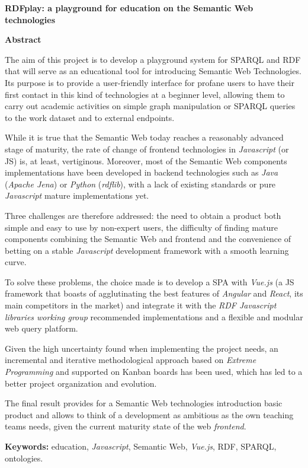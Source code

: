 %
\noindent \begin{center}
	\textbf{\Large{}RDFplay: a playground for education on the Semantic Web technologies}
	\par\end{center}{\Large \par}

\noindent \begin{center}
\textbf{\Large{}Abstract}
\par\end{center}{\Large \par}


The aim of this project is to develop a playground system for \gls{SPARQL} and \gls{RDF} that will serve as an educational tool for introducing Semantic Web Technologies. Its purpose is to provide a user-friendly interface for profane users to have their first contact in this kind of technologies at a beginner level, allowing them to carry out academic activities on simple graph manipulation or \gls{SPARQL} queries to the work dataset and to external endpoints.

While it is true that the Semantic Web today reaches a reasonably advanced stage of maturity, the rate of change of frontend technologies in \textit{Javascript} (or JS) is, at least, vertiginous. Moreover, most of the Semantic Web components implementations have been developed in backend technologies such as \textit{Java} (\textit{Apache Jena}) or \textit{Python} (\textit{rdflib}), with a lack of existing standards or pure \textit{Javascript} mature implementations yet.

Three challenges are therefore addressed: the need to obtain a product both simple and easy to use by non-expert users, the difficulty of finding mature components combining the Semantic Web and frontend and the convenience of betting on a stable \textit{Javascript} development framework with a smooth learning curve.

To solve these problems, the choice made is to develop a \gls{SPA} with \textit{Vue.js} (a JS framework that boasts of agglutinating the best features of \textit {Angular} and \textit {React}, its main competitors in the market) and integrate it with the \textit{RDF Javascript libraries working group} recommended implementations and a flexible and modular web query platform. 

Given the high uncertainty found when implementing the project needs, an incremental and iterative methodological approach based on \textit {Extreme Programming} and supported on Kanban boards has been used, which has led to a better project organization and evolution.

The final result provides for a Semantic Web technologies introduction basic product and allows to think of a development as ambitious as the own teaching teams needs, given the current maturity state of the web \textit {frontend}.

\textbf{Keywords:} education, \textit{Javascript}, Semantic Web, \textit{Vue.js}, \gls{RDF}, \gls{SPARQL}, ontologies.

%

